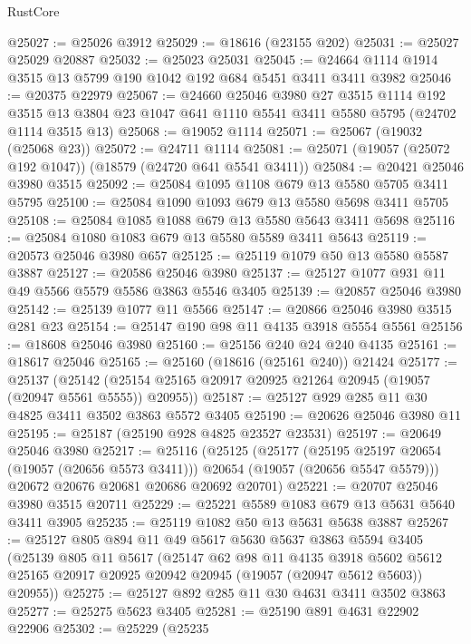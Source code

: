 \begin{lexlean}{RustCore}
\begin{coremodule}
@25027 := @25026 @3912
@25029 := @18616 (@23155 @202)
@25031 := @25027 @25029 @20887
@25032 := @25023 @25031
@25045 := @24664 @1114 @1914 @3515 @13 @5799 @190 @1042 @192 @684 @5451 @3411 @3411 @3982
@25046 := @20375 @22979
@25067 := @24660
    @25046
    @3980
    @27
    @3515
    @1114
    @192
    @3515
    @13
    @3804
    @23
    @1047
    @641
    @1110
    @5541
    @3411
    @5580
    @5795
    (@24702 @1114 @3515 @13)
@25068 := @19052 @1114
@25071 := @25067 (@19032 (@25068 @23))
@25072 := @24711 @1114
@25081 := @25071 (@19057 (@25072 @192 @1047)) (@18579 (@24720 @641 @5541 @3411))
@25084 := @20421 @25046 @3980 @3515
@25092 := @25084 @1095 @1108 @679 @13 @5580 @5705 @3411 @5795
@25100 := @25084 @1090 @1093 @679 @13 @5580 @5698 @3411 @5705
@25108 := @25084 @1085 @1088 @679 @13 @5580 @5643 @3411 @5698
@25116 := @25084 @1080 @1083 @679 @13 @5580 @5589 @3411 @5643
@25119 := @20573 @25046 @3980 @657
@25125 := @25119 @1079 @50 @13 @5580 @5587 @3887
@25127 := @20586 @25046 @3980
@25137 := @25127 @1077 @931 @11 @49 @5566 @5579 @5586 @3863 @5546 @3405
@25139 := @20857 @25046 @3980
@25142 := @25139 @1077 @11 @5566
@25147 := @20866 @25046 @3980 @3515 @281 @23
@25154 := @25147 @190 @98 @11 @4135 @3918 @5554 @5561
@25156 := @18608 @25046 @3980
@25160 := @25156 @240 @24 @240 @4135
@25161 := @18617 @25046
@25165 := @25160 (@18616 (@25161 @240)) @21424
@25177 := @25137
    (@25142 (@25154 @25165 @20917 @20925 @21264 @20945 (@19057 (@20947 @5561 @5555)) @20955))
@25187 := @25127 @929 @285 @11 @30 @4825 @3411 @3502 @3863 @5572 @3405
@25190 := @20626 @25046 @3980 @11
@25195 := @25187 (@25190 @928 @4825 @23527 @23531)
@25197 := @20649 @25046 @3980
@25217 := @25116
    (@25125
      (@25177
        (@25195 @25197 @20654 (@19057 (@20656 @5573 @3411)))
        @20654
        (@19057 (@20656 @5547 @5579)))
      @20672
      @20676
      @20681
      @20686
      @20692
      @20701)
@25221 := @20707 @25046 @3980 @3515 @20711
@25229 := @25221 @5589 @1083 @679 @13 @5631 @5640 @3411 @3905
@25235 := @25119 @1082 @50 @13 @5631 @5638 @3887
@25267 := @25127
    @805
    @894
    @11
    @49
    @5617
    @5630
    @5637
    @3863
    @5594
    @3405
    (@25139
      @805
      @11
      @5617
      (@25147
        @62
        @98
        @11
        @4135
        @3918
        @5602
        @5612
        @25165
        @20917
        @20925
        @20942
        @20945
        (@19057 (@20947 @5612 @5603))
        @20955))
@25275 := @25127 @892 @285 @11 @30 @4631 @3411 @3502 @3863
@25277 := @25275 @5623 @3405
@25281 := @25190 @891 @4631 @22902 @22906
@25302 := @25229
    (@25235

\end{coremodule}
\end{lexlean}

